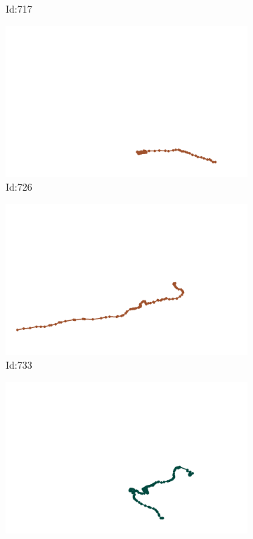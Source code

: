 \documentclass[12pt,twoside]{report}
\begin{document}
\begin{figure}
\begin{subfigure}[b]{0.20\textwidth}
\caption{Id:717}
\end{subfigure}
\begin{subfigure}[b]{0.20\textwidth}
\centering
\includegraphics[width=\textwidth]{../trajectories/726.png}
\caption{Id:726}
\end{subfigure}
\begin{subfigure}[b]{0.20\textwidth}
\centering
\includegraphics[width=\textwidth]{../trajectories/733.png}
\caption{Id:733}
\end{subfigure}
\begin{subfigure}[b]{0.20\textwidth}
\centering
\includegraphics[width=\textwidth]{../trajectories/734.png}

\end{subfigure}
\end{figure}
\end{document}
